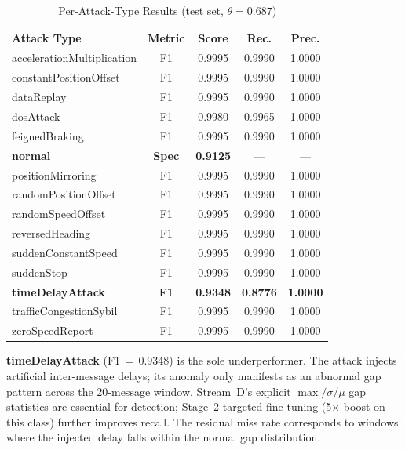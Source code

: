 \documentclass[conference]{IEEEtran}
\begin{document}
\begin{table}[t]
\centering
\caption{Per-Attack-Type Results (test set, $\theta=0.687$)}
\label{tab:per_attack}
\setlength{\tabcolsep}{3.5pt}
\begin{tabular}{lcccc}
\toprule
\textbf{Attack Type} & \textbf{Metric} & \textbf{Score} & \textbf{Rec.} & \textbf{Prec.} \\
\midrule
accelerationMultiplication & F1   & 0.9995 & 0.9990 & 1.0000 \\
constantPositionOffset     & F1   & 0.9995 & 0.9990 & 1.0000 \\
dataReplay                 & F1   & 0.9995 & 0.9990 & 1.0000 \\
dosAttack                  & F1   & 0.9980 & 0.9965 & 1.0000 \\
feignedBraking             & F1   & 0.9995 & 0.9990 & 1.0000 \\
\textbf{normal}            & \textbf{Spec} & \textbf{0.9125} & ---  & --- \\
positionMirroring          & F1   & 0.9995 & 0.9990 & 1.0000 \\
randomPositionOffset       & F1   & 0.9995 & 0.9990 & 1.0000 \\
randomSpeedOffset          & F1   & 0.9995 & 0.9990 & 1.0000 \\
reversedHeading            & F1   & 0.9995 & 0.9990 & 1.0000 \\
suddenConstantSpeed        & F1   & 0.9995 & 0.9990 & 1.0000 \\
suddenStop                 & F1   & 0.9995 & 0.9990 & 1.0000 \\
\textbf{timeDelayAttack}   & \textbf{F1} & \textbf{0.9348} & \textbf{0.8776} & \textbf{1.0000} \\
trafficCongestionSybil     & F1   & 0.9995 & 0.9990 & 1.0000 \\
zeroSpeedReport            & F1   & 0.9995 & 0.9990 & 1.0000 \\
\bottomrule
\end{tabular}
\end{table}

\textbf{timeDelayAttack} (F1\,$=$\,0.9348) is the sole underperformer.
The attack injects artificial inter-message delays; its anomaly only
manifests as an abnormal gap pattern across the 20-message window.
Stream~D's explicit $\max/\sigma/\mu$ gap statistics are essential for
detection; Stage~2 targeted fine-tuning (5$\times$ boost on this class)
further improves recall.  The residual miss rate corresponds to windows
where the injected delay falls within the normal gap distribution.
\end{document}

